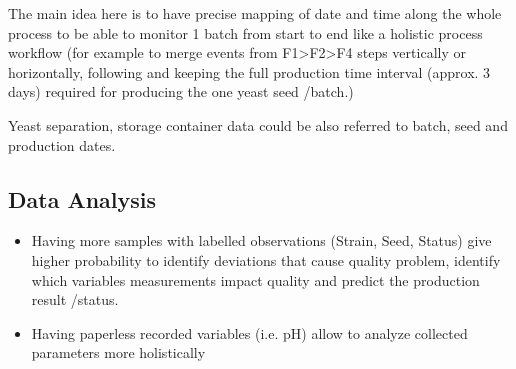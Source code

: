 The main idea here is to have  precise mapping of date and time along the whole process to be able to monitor 1 batch from start to end like a holistic process workflow (for example to merge events from F1>F2>F4 steps vertically or horizontally, following and keeping  the full production time interval (approx. 3 days) required for producing the one yeast seed /batch.) 

Yeast separation, storage container data could be also referred to batch, seed and production dates. 
\subsection{Data Analysis}

\begin{itemize}
    \item	Having more samples with labelled observations (Strain, Seed, Status) give higher probability to identify deviations that cause quality problem, identify which variables measurements impact quality and predict the production result /status.
    \item Having paperless recorded variables (i.e. pH) allow to analyze collected parameters more holistically 
\end{itemize}